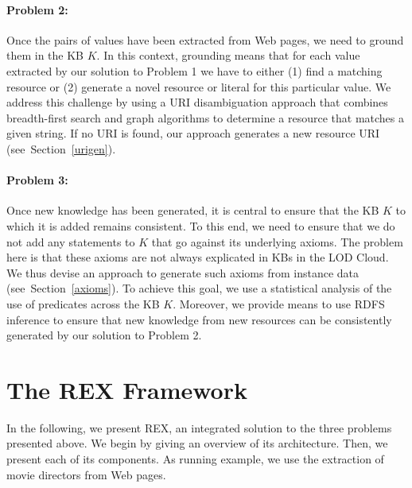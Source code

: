 \paragraph{Problem 2:}
Once the  pairs of values have been extracted from Web pages, we need to ground them in the  \ac{KB} $K$. 
In this context, grounding means that for each value extracted by our solution to Problem 1 we have to either (1) find a matching resource or (2) generate a novel resource or literal for this particular value. 
We address this challenge by using a URI disambiguation approach that combines breadth-first search and graph algorithms to determine a resource that matches a given string. 
If no URI is found, our approach generates a new resource URI (see~Section~\ref{urigen}). 

\paragraph{Problem 3:}
Once new knowledge has been generated, it is central to ensure that the  \ac{KB} $K$ to which it is added remains consistent. 
To this end, we need to ensure that we do not add any statements to $K$ that go against its underlying axioms. 
The problem here is that these axioms are not always explicated in  \ac{KB}s in the \ac{LOD} Cloud. 
We thus devise an approach to generate such axioms from instance data (see~Section~\ref{axioms}). 
To achieve this goal, we use a statistical analysis of the use of predicates across the  \ac{KB} $K$. 
Moreover, we provide means to use RDFS inference to ensure that new knowledge from new resources can be consistently generated by our solution to Problem 2.


\section{The REX Framework}
\label{sec:rex}
In the following, we present REX, an integrated  solution to the three problems presented above.
We begin by giving an overview of its architecture.
Then, we present each of its components.
As running example, we use the extraction of movie directors from Web pages.

